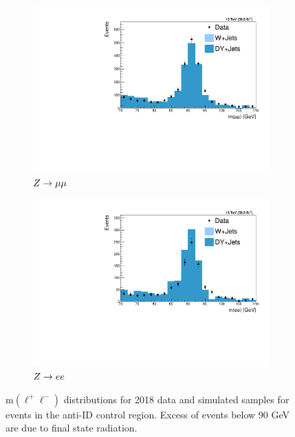 \begin{figure}[htb!]
	\centering
	\captionsetup[subfigure]{justification=centering}
	\begin{subfigure}[h]{0.45\linewidth}
		\centering
		\includegraphics[width=\linewidth]{figs/05_analysis/2018_ZX_Z_mass_MU_preselection_med.pdf}
		\caption{$Z\to\mu\mu$}
	\end{subfigure}
	\begin{subfigure}[h]{0.45\linewidth}
		\centering
		\includegraphics[width=\linewidth]{figs/05_analysis/2018_ZX_Z_mass_ELE_preselection_med.pdf}
		\caption{$Z\to ee$}
	\end{subfigure}
	\caption[m$\left(\ell^+\ell^-\right)$ distributions for 2018 data and simulated samples for events in the anti-ID control region. Excess of events below 90 GeV are due to final state radiation.]{m$\left(\ell^+\ell^-\right)$ distributions for 2018 data and simulated samples for events in the anti-ID control region. Excess of events below 90 GeV are due to final state radiation.}
	\label{fig:zmass2018_preselection_med}
\end{figure}

